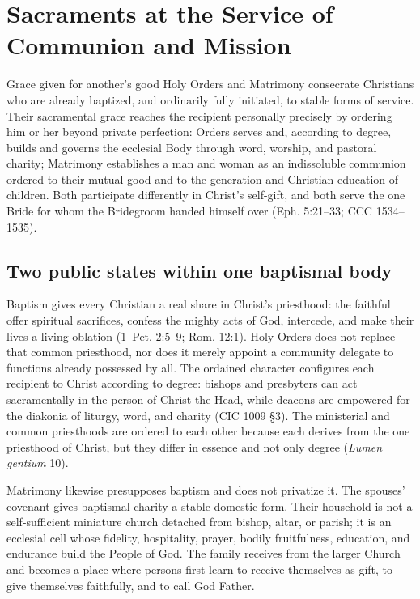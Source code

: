 \section{Sacraments at the Service of Communion and Mission}

\begin{massbox}{Grace given for another's good}
Holy Orders and Matrimony consecrate Christians who are already baptized, and ordinarily fully initiated, to stable forms of service. Their sacramental grace reaches the recipient personally precisely by ordering him or her beyond private perfection: Orders serves and, according to degree, builds and governs the ecclesial Body through word, worship, and pastoral charity; Matrimony establishes a man and woman as an indissoluble communion ordered to their mutual good and to the generation and Christian education of children. Both participate differently in Christ's self-gift, and both serve the one Bride for whom the Bridegroom handed himself over (Eph. 5:21--33; CCC 1534--1535).
\end{massbox}

\subsection{Two public states within one baptismal body}

Baptism gives every Christian a real share in Christ's priesthood: the faithful offer spiritual sacrifices, confess the mighty acts of God, intercede, and make their lives a living oblation (1~Pet. 2:5--9; Rom. 12:1). Holy Orders does not replace that common priesthood, nor does it merely appoint a community delegate to functions already possessed by all. The ordained character configures each recipient to Christ according to degree: bishops and presbyters can act sacramentally in the person of Christ the Head, while deacons are empowered for the diakonia of liturgy, word, and charity (CIC 1009 \S3). The ministerial and common priesthoods are ordered to each other because each derives from the one priesthood of Christ, but they differ in essence and not only degree (\emph{Lumen gentium} 10).

Matrimony likewise presupposes baptism and does not privatize it. The spouses' covenant gives baptismal charity a stable domestic form. Their household is not a self-sufficient miniature church detached from bishop, altar, or parish; it is an ecclesial cell whose fidelity, hospitality, prayer, bodily fruitfulness, education, and endurance build the People of God. The family receives from the larger Church and becomes a place where persons first learn to receive themselves as gift, to give themselves faithfully, and to call God Father.

